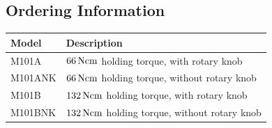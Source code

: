 \documentclass[a4paper, final, 12pt, oneside]{scrartcl}
\numberwithin{equation}{section}
\numberwithin{table}{section}
\numberwithin{figure}{section}
\begin{document}
\subsection*{Ordering Information}
\begin{table}[!hp]
  \begin{tabular}{ll}
    \toprule
    \textbf{Model} & \textbf{Description}\\
    \toprule
    M101A   & $\unit[66]{Ncm}$ holding torque, with rotary knob \\
    M101ANK & $\unit[66]{Ncm}$ holding torque, without rotary knob \\
    M101B   & $\unit[132]{Ncm}$ holding torque, with rotary knob \\
    M101BNK & $\unit[132]{Ncm}$ holding torque, without rotary knob \\
    \bottomrule
  \end{tabular}
\end{table}















\FloatBarrier
\vfill
\end{document}
